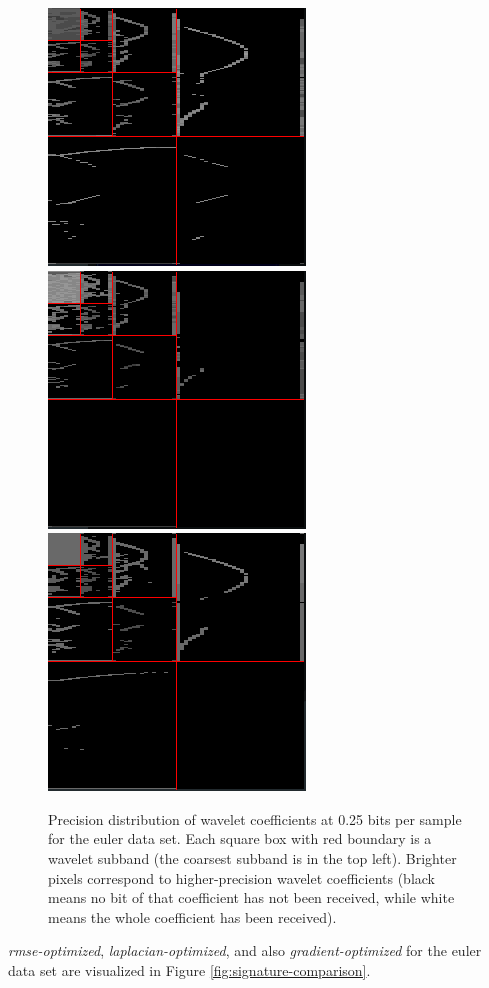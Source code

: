 \begin{figure}
	\centering
	{\includegraphics[width=0.32\linewidth]{img/gradient-laplacian/euler-prec-lap.png}}
	{\includegraphics[width=0.32\linewidth]{img/gradient-laplacian/euler-prec-rmse.png}}
	{\includegraphics[width=0.32\linewidth]{img/gradient-laplacian/euler-prec-signature.png}}
	\caption{Precision distribution of wavelet coefficients at 0.25 bits per sample for the euler data
	set. Each square box with red boundary is a wavelet subband (the coarsest subband is in the top
	left). Brighter pixels correspond to higher-precision wavelet coefficients (black means no bit of
	that coefficient has not been received, while white means the whole coefficient has been
	received).}
	\label{fig:laplacian-precision-comparison}
\end{figure}

\emph{rmse-optimized}, \emph{laplacian-optimized}, and also \emph{gradient-optimized} for the euler
data set are visualized in Figure \ref{fig:signature-comparison}. 

